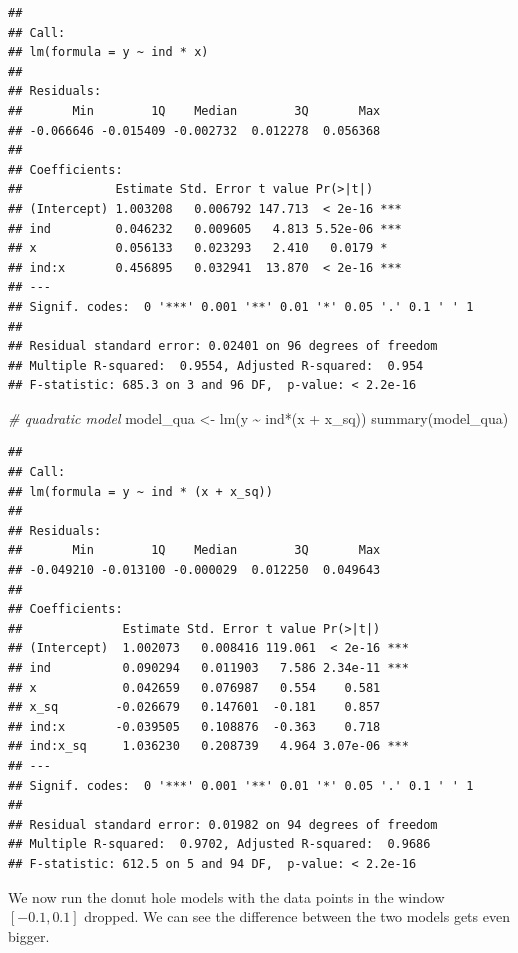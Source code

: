 \documentclass[
  11pt,
]{article}
\newenvironment{Shaded}{\begin{snugshade}}{\end{snugshade}}
\newcommand{\CommentTok}[1]{\textcolor[rgb]{0.56,0.35,0.01}{\textit{#1}}}
\newcommand{\FunctionTok}[1]{\textcolor[rgb]{0.00,0.00,0.00}{#1}}
\newcommand{\NormalTok}[1]{#1}
\newcommand{\OtherTok}[1]{\textcolor[rgb]{0.56,0.35,0.01}{#1}}
\newcommand{\SpecialCharTok}[1]{\textcolor[rgb]{0.00,0.00,0.00}{#1}}
\begin{document}
\begin{verbatim}
## 
## Call:
## lm(formula = y ~ ind * x)
## 
## Residuals:
##       Min        1Q    Median        3Q       Max 
## -0.066646 -0.015409 -0.002732  0.012278  0.056368 
## 
## Coefficients:
##             Estimate Std. Error t value Pr(>|t|)    
## (Intercept) 1.003208   0.006792 147.713  < 2e-16 ***
## ind         0.046232   0.009605   4.813 5.52e-06 ***
## x           0.056133   0.023293   2.410   0.0179 *  
## ind:x       0.456895   0.032941  13.870  < 2e-16 ***
## ---
## Signif. codes:  0 '***' 0.001 '**' 0.01 '*' 0.05 '.' 0.1 ' ' 1
## 
## Residual standard error: 0.02401 on 96 degrees of freedom
## Multiple R-squared:  0.9554, Adjusted R-squared:  0.954 
## F-statistic: 685.3 on 3 and 96 DF,  p-value: < 2.2e-16
\end{verbatim}

\begin{Shaded}
\begin{Highlighting}[]
\CommentTok{\# quadratic model}
\NormalTok{model\_qua }\OtherTok{\textless{}{-}} \FunctionTok{lm}\NormalTok{(y }\SpecialCharTok{\textasciitilde{}}\NormalTok{ ind}\SpecialCharTok{*}\NormalTok{(x }\SpecialCharTok{+}\NormalTok{ x\_sq))}
\FunctionTok{summary}\NormalTok{(model\_qua)}
\end{Highlighting}
\end{Shaded}

\begin{verbatim}
## 
## Call:
## lm(formula = y ~ ind * (x + x_sq))
## 
## Residuals:
##       Min        1Q    Median        3Q       Max 
## -0.049210 -0.013100 -0.000029  0.012250  0.049643 
## 
## Coefficients:
##              Estimate Std. Error t value Pr(>|t|)    
## (Intercept)  1.002073   0.008416 119.061  < 2e-16 ***
## ind          0.090294   0.011903   7.586 2.34e-11 ***
## x            0.042659   0.076987   0.554    0.581    
## x_sq        -0.026679   0.147601  -0.181    0.857    
## ind:x       -0.039505   0.108876  -0.363    0.718    
## ind:x_sq     1.036230   0.208739   4.964 3.07e-06 ***
## ---
## Signif. codes:  0 '***' 0.001 '**' 0.01 '*' 0.05 '.' 0.1 ' ' 1
## 
## Residual standard error: 0.01982 on 94 degrees of freedom
## Multiple R-squared:  0.9702, Adjusted R-squared:  0.9686 
## F-statistic: 612.5 on 5 and 94 DF,  p-value: < 2.2e-16
\end{verbatim}

We now run the donut hole models with the data points in the window
\([-0.1, 0.1]\) dropped. We can see the difference between the two
models gets even bigger.
\end{document}
